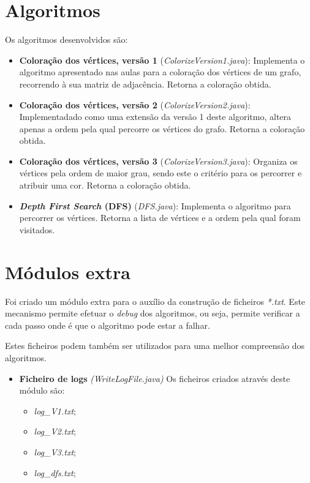 \documentclass[a4paper,12pt]{report}
\begin{document}
\section{Algoritmos}
Os algoritmos desenvolvidos são:
\begin{itemize}
    \item \textbf{Coloração dos vértices, versão 1} (\textit{ColorizeVersion1.java}):
    Implementa o algoritmo apresentado nas aulas para a coloração dos vértices de um grafo, recorrendo à sua matriz de adjacência. Retorna a coloração obtida.
    \item \textbf{Coloração dos vértices, versão 2} (\textit{ColorizeVersion2.java}):
    Implementadado como uma extensão da versão 1 deste algoritmo, altera apenas a ordem pela qual percorre os vértices do grafo. Retorna a coloração obtida.
    \item \textbf{Coloração dos vértices, versão 3} (\textit{ColorizeVersion3.java}): Organiza os vértices pela ordem de maior grau, sendo este o critério para os percorrer e atribuir uma cor. Retorna a coloração obtida.
    \item \textbf{\textit{Depth First Search} (DFS)} (\textit{DFS.java}): Implementa o algoritmo para percorrer os vértices. Retorna a lista de vértices e a ordem pela qual foram visitados.
\end{itemize}

\section{Módulos extra}
Foi criado um módulo extra para o auxílio da construção de ficheiros \textit{*.txt}. Este mecanismo permite efetuar o \textit{debug} dos algoritmos, ou seja, permite verificar a cada passo onde é que o algoritmo pode estar a falhar.

Estes ficheiros podem também ser utilizados para uma melhor compreensão dos algoritmos.

\begin{itemize}
    \item \textbf{Ficheiro de logs} \textit{(WriteLogFile.java)} Os ficheiros criados através deste módulo são:
    \begin{itemize}
        \item\textit{log\_V1.txt};
        \item\textit{log\_V2.txt};
        \item\textit{log\_V3.txt};
        \item\textit{log\_dfs.txt};
    \end{itemize}
\end{itemize}
\end{document}
